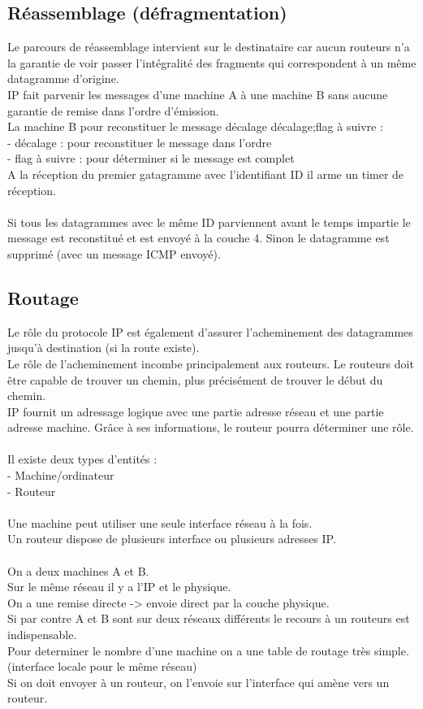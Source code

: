 \documentclass{article}
\begin{document}
\subsection{Réassemblage (défragmentation)}
Le parcours de réassemblage intervient sur le destinataire car aucun routeurs n'a la garantie de voir passer l'intégralité des fragments qui correspondent à un même datagramme d'origine. \\
IP fait parvenir les messages d'une machine A à une machine B sans aucune garantie de remise dans l'ordre d'émission. \\
La machine B pour reconstituer le message décalage décalage;flag à suivre : \\
- décalage : pour reconstituer le message dans l'ordre \\
- flag à suivre : pour déterminer si le message est complet \\
A la réception du premier gatagramme avec l'identifiant ID il arme un timer de réception. \\
\\
Si tous les datagrammes avec le même ID parviennent avant le temps impartie le message est reconstitué  et est envoyé à la couche 4. Sinon le datagramme est supprimé (avec un message ICMP envoyé).

\subsection{Routage}
Le rôle du protocole IP est également d'assurer l'acheminement des datagrammes jusqu'à destination (si la route existe). \\
Le rôle de l'acheminement incombe principalement aux routeurs. Le routeurs doit être capable de trouver un chemin, plus précisément de trouver le début du chemin. \\
IP fournit un adressage logique avec une partie adresse réseau et une partie adresse machine. Grâce à ses informations, le routeur pourra déterminer une rôle. \\ 
\\
Il existe deux types d'entités : \\
- Machine/ordinateur \\
- Routeur \\ 
\\
Une machine peut utiliser une seule interface réseau à la fois. \\
Un routeur dispose de plusieurs interface ou plusieurs adresses IP. \\
\\
On a deux machines A et B. \\
Sur le même réseau il y a  l'IP et  le physique. \\
On a une remise directe -> envoie direct par la couche physique. \\
Si par contre A et B sont sur deux réseaux différents le recours à un routeurs est indispensable. \\
Pour determiner le nombre d'une machine on a une table de routage très simple. (interface locale pour le même réseau) \\
Si on doit envoyer à un routeur, on l'envoie sur l'interface qui amène vers un routeur.
\end{document}
